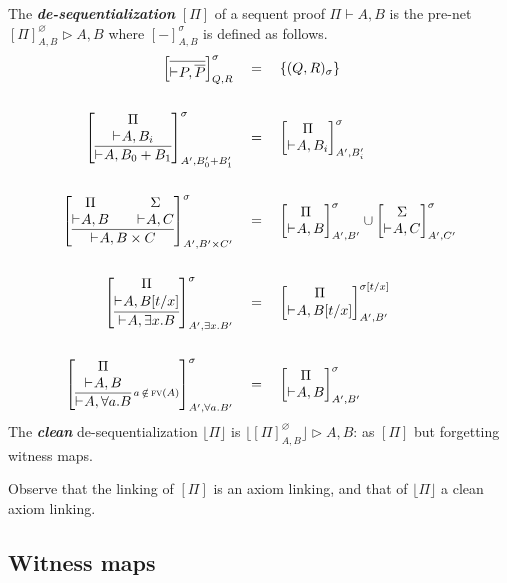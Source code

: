 \documentclass[UKenglish]{lipics-v2016}
\theoremstyle{plain}
\newcommand\defn[1]{\textit{\textbf{#1}}}
\newcommand\floor[1]{\lfloor#1\rfloor}
\newcommand\+{+}
\renewcommand\*{\times}
\newcommand\dual[1]{\overline{#1}}
\newcommand\seq[3][]{{\vdash_{#1}}#2,#3}
\newcommand\prf[3]{#1\vdash\!#2,#3}
\newcommand\net[3]{#1\triangleright #2,#3}
\newcommand\deseq[4][\sigma]{[#2]^{#1}_{#3,#4}}
\newcommand\Deseq[4][\sigma]{\left[\vcenter{#2}\right]^{#1}_{#3,#4}}
\newcommand\link[3][\sigma]{(#2,#3)_{#1}}
\begin{document}


\begin{definition}
The \defn{de-sequentialization} $[\Pi]$ of a sequent proof $\prf\Pi AB$ is the pre-net $\net{\deseq[\varnothing]\Pi AB} AB$ where $\deseq-AB$ is defined as follows.
%
\begin{align*}
	\Deseq{\infer{\seq P{\dual P}}{}}QR &\quad=\quad \{\link QR\}
\\ \\
	\Deseq{\infer {\seq A {B_0\+B_1}} {\deduce [\rule{0pt}{1pt}] {\seq A{B_i}} \Pi }}
	  {A'}{B_0'\+B'_1} 
	& \quad=\quad 
	\Deseq{\deduce[\rule{0pt}{1pt}]{\seq A{B_i}}\Pi}{A'}{B_i'}
\\ \\
	\Deseq{\infer{\seq A{B\*C}}{
	  \deduce[\rule{0pt}{1pt}]{\seq AB}\Pi 
	  && 
	  \deduce[\rule{0pt}{1pt}]{\seq AC}\Sigma}}{A'}{B'\*C'}
	& \quad=\quad 
	  \Deseq{\deduce[\rule{0pt}{1pt}]{\seq AB}\Pi}{A'}{B'}
	  \cup
	  \Deseq{\deduce[\rule{0pt}{1pt}]{\seq AC}\Sigma}{A'}{C'}
\\ \\
	\Deseq{\infer{\seq A{\exists x.B}}{\deduce[\rule{0pt}{1pt}]{\seq A{B[t/x]}}\Pi}}
	  {A'}{\exists x.B'}
	& \quad=\quad 
	 \Deseq[{\sigma[t/x]}]{\deduce[\rule{0pt}{1pt}]{\seq A{B[t/x]}}\Pi}
	  {A'}{B'}
\\ \\
	\Deseq{\infer[\!\!\scriptstyle{a\,\notin\,\textsc{fv}(A)}]
	  {\seq A{\forall a.B}}{\deduce[\rule{0pt}{1pt}]{\seq AB}\Pi}}{A'}{\forall a.B'}
	& \quad=\quad 
	  \Deseq{\deduce[\rule{0pt}{1pt}]{\seq AB}\Pi}{A'}{B'}
\end{align*}
%
The \defn{clean} de-sequentialization $\floor\Pi$ is $\net{\floor{\deseq[\varnothing]\Pi AB}}AB$:  as $[\Pi]$ but forgetting witness maps.
%
\end{definition}

Observe that the linking of $[\Pi]$ is an axiom linking, and that of $\floor\Pi$ a clean axiom linking.


\subsection{Witness maps}
\end{document}
